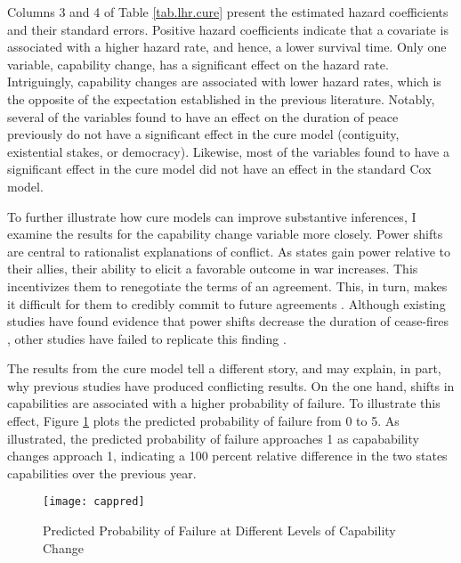 \documentclass[letterpaper, 12pt]{article}
\theoremstyle{plain}
\begin{document}
Columns 3 and 4 of Table \ref{tab.lhr.cure} present the estimated hazard coefficients and their standard errors. Positive hazard coefficients indicate that a covariate is associated with a higher hazard rate, and hence, a lower survival time. Only one variable, capability change, has a significant effect on the hazard rate. Intriguingly, capability changes are associated with lower hazard rates, which is the opposite of the expectation established in the previous literature. Notably, several of the variables found to have an effect on the duration of peace previously do not have a significant effect in the cure model (contiguity, existential stakes, or democracy). Likewise, most of the variables found to have a significant effect in the cure model did not have an effect in the standard Cox model.

To further illustrate how cure models can improve substantive inferences, I examine the results for the capability change variable more closely. 
Power shifts are central to rationalist explanations of conflict. As states gain power relative to their allies, their ability to elicit a favorable outcome in war increases. This incentivizes them to renegotiate the terms of an agreement. This, in turn, makes it difficult for them to credibly commit to future agreements \citep{fearon1995, powell2006}. Although existing studies have found evidence that power shifts decrease the duration of cease-fires \citep{werner1999, werner2005}, other studies have failed to replicate this finding \citep{fortna2003, lo2008}.

The results from the cure model tell a different story, and may explain, in part, why previous studies have produced conflicting results. On the one hand, shifts in capabilities are associated with a higher probability of failure. To illustrate this effect, Figure \ref{fig:lhr.cap.pp} plots the predicted probability of failure from 0 to 5.%
As illustrated, the predicted probability of failure approaches 1 as capabability changes approach 1, indicating a 100 percent relative difference in the two states capabilities over the previous year.

\begin{figure}[htbp]\centering
	\caption{Predicted Probability of Failure at Different Levels of Capability Change}
	\texttt{[image: cappred]}
	\label{fig:lhr.cap.pp}
\end{figure}
\end{document}
